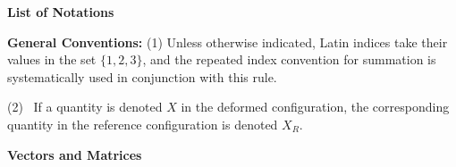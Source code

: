 \newpage



\begin{center}
{\Large\bf List of Notations}\pageoriginale
\end{center}


\noindent
{\bf General Conventions:} (1) Unless otherwise indicated, Latin indices
take their values in the set $\{1,2,3\}$, and the repeated index
convention for summation is systematically used in conjunction with
this rule.

(2)~ If a quantity is denoted $X$ in the deformed configuration, the
corresponding quantity in the reference configuration is denoted
$X_{R}$.

\bigskip
\noindent
{\bf Vectors and Matrices}
